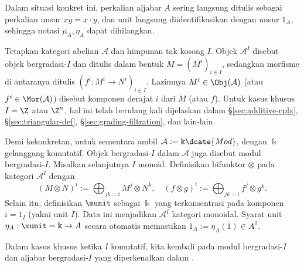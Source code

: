 Dalam situasi konkret ini, perkalian aljabar $A$ sering langsung ditulis
sebagai perkalian unsur $xy=x\cdot y$, dan unit langsung diidentifikasikan
dengan unsur $1_A$, sehingga notasi $\mu_A,\eta_A$ dapat dihilangkan.

\begin{contoh}\label{eg:graded-module}
	Tetapkan kategori abelian $\mathcal{A}$ dan himpunan tak kosong $I$. Objek
	$\mathcal{A}^I$ disebut objek bergradasi-$I$ dan ditulis dalam bentuk
	$M=(M^i)_{i\in I}$, sedangkan morfisme di antaranya ditulis
	$(f^i:M^i\to N^i)_{i\in I}$. Lazimnya $M^i\in\Obj(\mathcal{A})$ (atau
	$f^i\in\Mor(\mathcal{A})$) disebut komponen derajat $i$ dari $M$ (atau
	$f$). Untuk kasus khusus $I=\Z$ atau $\Z^n$, hal ini telah berulang kali
	dijelaskan dalam \S\ref{sec:additive-cplx}, \S\ref{sec:triangular-def},
	\S\ref{sec:grading-filtration}, dan lain-lain.
	
	Demi kekonkretan, untuk sementara ambil $\mathcal{A}:=\Bbbk\dcate{Mod}$,
	dengan $\Bbbk$ gelanggang komutatif. Objek bergradasi-$I$ dalam
	$\mathcal{A}$ juga disebut modul bergradasi-$I$. Misalkan selanjutnya $I$
	monoid. Definisikan bifunktor $\otimes$ pada kategori $\mathcal{A}^I$ dengan
	\begin{equation}\label{eqn:graded-module}
		(M \otimes N)^i := \bigoplus_{jk=i} M^j \otimes N^k, \quad (f \otimes g)^i := \bigoplus_{jk=i} f^j \otimes g^k .
	\end{equation}
	Selain itu, definisikan $\munit$ sebagai $\Bbbk$ yang terkonsentrasi pada
	komponen $i=1_I$ (yakni unit $I$). Data ini menjadikan $\mathcal{A}^I$
	kategori monoidal. Syarat unit $\eta_A:\munit=\Bbbk\to A$ secara otomatis
	memastikan $1_A:=\eta_A(1)\in A^0$.
	
	Dalam kasus khusus ketika $I$ komutatif, kita kembali pada modul
	bergradasi-$I$ dan aljabar bergradasi-$I$ yang diperkenalkan dalam
	\cite[Definisi 7.4.1]{Li1}.


\end{contoh}
